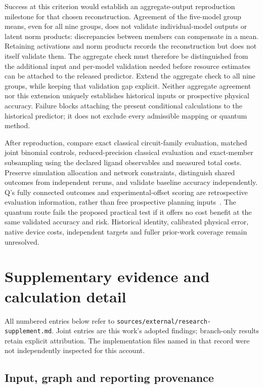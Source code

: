 \documentclass{article}
\begin{document}
Success at this criterion would establish an aggregate-output reproduction milestone for that chosen reconstruction. Agreement of the five-model group means, even for all nine groups, does not validate individual-model outputs or latent norm products: discrepancies between members can compensate in a mean. Retaining activations and norm products records the reconstruction but does not itself validate them. The aggregate check must therefore be distinguished from the additional input and per-model validation needed before resource estimates can be attached to the released predictor. Extend the aggregate check to all nine groups, while keeping that validation gap explicit. Neither aggregate agreement nor this extension uniquely establishes historical inputs or prospective physical accuracy. Failure blocks attaching the present conditional calculations to the historical predictor; it does not exclude every admissible mapping or quantum method.

After reproduction, compare exact classical circuit-family evaluation, matched joint binomial controls, reduced-precision classical evaluation and exact-member subsampling using the declared ligand observables and measured total costs. Preserve simulation allocation and network constraints, distinguish shared outcomes from independent reruns, and validate baseline accuracy independently. Q's fully connected outcomes and experimental-offset scoring are retrospective evaluation information, rather than free prospective planning inputs~\cite{Q}. The quantum route fails the proposed practical test if it offers no cost benefit at the same validated accuracy and risk. Historical identity, calibrated physical error, native device costs, independent targets and fuller prior-work coverage remain unresolved.

\appendix
\section{Supplementary evidence and calculation detail}

All numbered entries below refer to \texttt{sources/external/research-supplement.md}. Joint entries are this work's adopted findings; branch-only results retain explicit attribution. The implementation files named in that record were not independently inspected for this account.

\subsection{Input, graph and reporting provenance}
\end{document}

